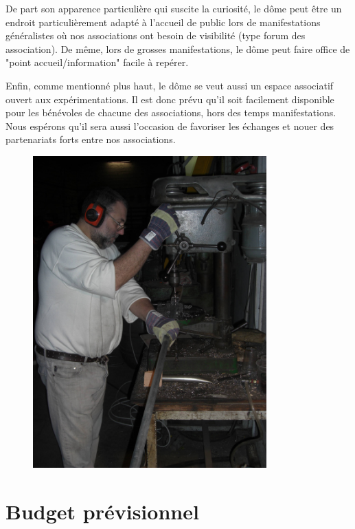 \documentclass[a4paper,12pt]{report}
\begin{document}
De part son apparence particulière qui suscite la curiosité, le dôme peut être
un endroit particulièrement adapté à l'accueil de public lors de manifestations
généralistes où nos associations ont besoin de visibilité (type forum des
association). De même, lors de grosses manifestations, le dôme peut faire
office de "point accueil/information" facile à repérer.

Enfin, comme mentionné plus haut, le dôme se veut aussi un espace associatif
ouvert aux expérimentations. Il est donc prévu qu'il soit facilement disponible
pour les bénévoles de chacune des associations, hors des temps manifestations.
Nous espérons qu'il sera aussi l'occasion de favoriser les échanges et nouer
des partenariats forts entre nos associations.

\begin{figure}[!h]
\centering
\includegraphics[width=9cm]{percage.jpg}
\end{figure}


\chapter{Budget prévisionnel}
\end{document}
